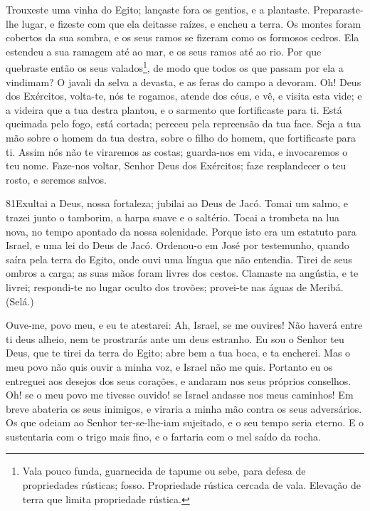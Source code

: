 Trouxeste uma vinha do Egito; lançaste fora os gentios, e a
plantaste. Preparaste-lhe lugar, e fizeste com que ela deitasse
raízes, e encheu a terra. Os montes foram cobertos da sua
sombra, e os seus ramos se fizeram como os formosos cedros.
Ela estendeu a sua ramagem até ao mar, e os seus ramos até ao
rio. Por que quebraste então os seus valados\footnote{Vala
pouco funda, guarnecida de tapume ou sebe, para defesa de
propriedades rústicas; fosso. Propriedade rústica cercada de vala.
Elevação de terra que limita propriedade rústica.}, de modo que
todos os que passam por ela a vindimam? O javali da selva a
devasta, e as feras do campo a devoram. Oh! Deus dos
Exércitos, volta-te, nós te rogamos, atende dos céus, e vê, e visita
esta vide; e a videira que a tua destra plantou, e o sarmento
que fortificaste para ti. Está queimada pelo fogo, está
cortada; pereceu pela repreensão da tua face. Seja a tua mão
sobre o homem da tua destra, sobre o filho do homem, que
fortificaste para ti. Assim nós não te viraremos as costas;
guarda-nos em vida, e invocaremos o teu nome. Faze-nos
voltar, Senhor Deus dos Exércitos; faze resplandecer o teu rosto, e
seremos salvos.

\bigskip

\lettrine{81}{}Exultai a Deus, nossa fortaleza; jubilai ao Deus
de Jacó. Tomai um salmo, e trazei junto o tamborim, a harpa
suave e o saltério. Tocai a trombeta na lua nova, no tempo
apontado da nossa solenidade. Porque isto era um estatuto para
Israel, e uma lei do Deus de Jacó. Ordenou-o em José por
testemunho, quando saíra pela terra do Egito, onde ouvi uma língua
que não entendia. Tirei de seus ombros a carga; as suas mãos
foram livres dos cestos. Clamaste na angústia, e te livrei;
respondi-te no lugar oculto dos trovões; provei-te nas águas de
Meribá. (Selá.)

Ouve-me, povo meu, e eu te atestarei: Ah, Israel, se me ouvires!
Não haverá entre ti deus alheio, nem te prostrarás ante um deus
estranho. Eu sou o Senhor teu Deus, que te tirei da terra do
Egito; abre bem a tua boca, e ta encherei. Mas o meu povo não
quis ouvir a minha voz, e Israel não me quis. Portanto eu os
entreguei aos desejos dos seus corações, e andaram nos seus próprios
conselhos. Oh! se o meu povo me tivesse ouvido! se Israel
andasse nos meus caminhos! Em breve abateria os seus
inimigos, e viraria a minha mão contra os seus adversários.
Os que odeiam ao Senhor ter-se-lhe-iam sujeitado, e o seu
tempo seria eterno. E o sustentaria com o trigo mais fino, e
o fartaria com o mel saído da rocha.

